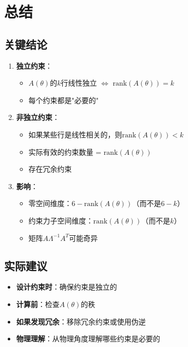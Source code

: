 \documentclass[12pt,a4paper]{article}
\begin{document}
\section{总结}

\subsection{关键结论}

\begin{enumerate}
\item \textbf{独立约束}：
\begin{itemize}
\item $A(\theta)$的$k$行线性独立 $\Leftrightarrow$ $\text{rank}(A(\theta)) = k$
\item 每个约束都是"必要的"
\end{itemize}

\item \textbf{非独立约束}：
\begin{itemize}
\item 如果某些行是线性相关的，则$\text{rank}(A(\theta)) < k$
\item 实际有效的约束数量 = $\text{rank}(A(\theta))$
\item 存在冗余约束
\end{itemize}

\item \textbf{影响}：
\begin{itemize}
\item 零空间维度：$6 - \text{rank}(A(\theta))$（而不是$6 - k$）
\item 约束力子空间维度：$\text{rank}(A(\theta))$（而不是$k$）
\item 矩阵$A\Lambda^{-1}A^T$可能奇异
\end{itemize}
\end{enumerate}

\subsection{实际建议}

\begin{itemize}
\item \textbf{设计约束时}：确保约束是独立的
\item \textbf{计算前}：检查$A(\theta)$的秩
\item \textbf{如果发现冗余}：移除冗余约束或使用伪逆
\item \textbf{物理理解}：从物理角度理解哪些约束是必要的
\end{itemize}
\end{document}
